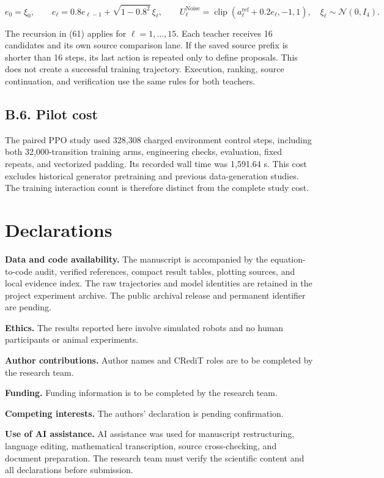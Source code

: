 \documentclass[
  american,
  11pt,
  a4paper,
]{article}
\begin{document}
\[
e_0=\xi_0,\qquad
e_\ell=0.8e_{\ell-1}+\sqrt{1-0.8^2}\,\xi_\ell,\qquad
U_\ell^{\mathrm{Noise}}=\operatorname{clip}(a_\ell^{\mathrm{ref}}+0.2e_\ell,-1,1),
\quad \xi_\ell\sim\mathcal N(0,I_4).
\tag{61}\label{eq:61}
\]

The recursion in (61) applies for \(\ell=1,\ldots,15\). Each teacher
receives 16 candidates and its own source comparison lane. If the saved
source prefix is shorter than 16 steps, its last action is repeated only
to define proposals. This does not create a successful training
trajectory. Execution, ranking, source continuation, and verification
use the same rules for both teachers.

\subsection{B.6. Pilot cost}\label{b.6.-pilot-cost}

The paired PPO study used 328,308 charged environment control steps,
including both 32,000-transition training arms, engineering checks,
evaluation, fixed repeats, and vectorized padding. Its recorded wall
time was 1,591.64 s. This cost excludes historical generator pretraining
and previous data-generation studies. The training interaction count is
therefore distinct from the complete study cost.

\section{Declarations}\label{declarations}

\textbf{Data and code availability.} The manuscript is accompanied by
the equation-to-code audit, verified references, compact result tables,
plotting sources, and local evidence index. The raw trajectories and
model identities are retained in the project experiment archive. The
public archival release and permanent identifier are pending.

\textbf{Ethics.} The results reported here involve simulated robots and
no human participants or animal experiments.

\textbf{Author contributions.} Author names and CRediT roles are to be
completed by the research team.

\textbf{Funding.} Funding information is to be completed by the research
team.

\textbf{Competing interests.} The authors' declaration is pending
confirmation.

\textbf{Use of AI assistance.} AI assistance was used for manuscript
restructuring, language editing, mathematical transcription, source
cross-checking, and document preparation. The research team must verify
the scientific content and all declarations before submission.
\end{document}
